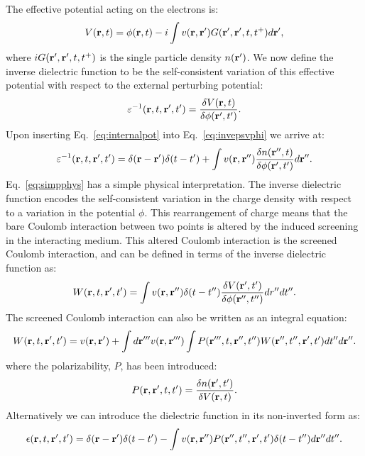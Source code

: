 The effective potential acting on the electrons is:
%
\begin{equation}
\label{eq:internalpot}
V({\bf r},t) = \phi({\bf r},t) - i\int v({\bf r},{\bf r}') G({\bf r}',{\bf r}',t,t^{+}) d{\bf r}',
\end{equation}
%
where $iG({\bf r}',{\bf r}',t,t^{+})$ is the single particle density $n({\bf r}')$.
%
We now define the inverse dielectric function to be the self-consistent variation 
of this effective potential with respect to the external perturbing potential:
%
\begin{equation}
\label{eq:invepsvphi}
\varepsilon^{-1}({\bf r},t,{\bf r}',t') = \frac{\delta V({\bf r},t)}{\delta\phi({\bf r}',t')}.
\end{equation}
%
Upon inserting Eq.~\ref{eq:internalpot} into Eq.~\ref{eq:invepsvphi} we arrive at:
%
\begin{equation}
\label{eq:simpphys}
\varepsilon^{-1}({\bf r},t,{\bf r}',t') = \delta({\bf r}-{\bf r}')\delta(t-t') + \int v({\bf r},{\bf r}'') \frac{\delta n({\bf r}'',t)}{\delta\phi({\bf r^\prime},t')}d{\bf r}''.
\end{equation}
%
Eq.~\ref{eq:simpphys} has a simple physical interpretation. The inverse dielectric function 
encodes the self-consistent variation in the charge density 
with respect to a variation in the potential $\phi$.
This rearrangement of charge means that the bare Coulomb interaction
 between two points is altered by the induced screening in
the interacting medium. This altered Coulomb interaction is the 
screened Coulomb interaction, and can be defined 
in terms of the inverse dielectric function as:
%
\begin{equation}
\label{eq:scrncoul}
W({\bf r},t,{\bf r}',t') = \int v({\bf r},{\bf r}'')\delta(t-t'') \frac{\delta V({\bf r}',t')}{\delta \phi({\bf r}'',t'')} dr''dt''.
\end{equation}
%
The screened Coulomb interaction can also be written as an integral equation: 
%
\begin{equation}
\label{eq:dysw}
W({\bf r},t,{\bf r}',t') =  v({\bf r},{\bf r}') + \int d{\bf r}''' v({\bf r},{\bf r}''')\int P({\bf r}''',t,{\bf r}'',t'') W({\bf r}'',t'',{\bf r}',t')dt''d{\bf r}''.
\end{equation}
%
where the polarizability, $P$, has been introduced:
%
\begin{equation}
P({\bf r},{\bf r}',t,t') = \frac{\delta n({\bf r}',t')}{\delta V({\bf r},t)}.
\end{equation}
%
Alternatively we can introduce the dielectric function in its non-inverted form as:
%
\begin{equation}
\label{eq:epschap2}
\epsilon({\bf r},t,{\bf r^\prime},t') = \delta({\bf r}-{\bf r}')\delta(t-t') - \int v({\bf r},{\bf r}'') P({\bf r}'',t'',{\bf r}',t') \delta(t-t'') d{\bf r}''dt''.
\end{equation}

